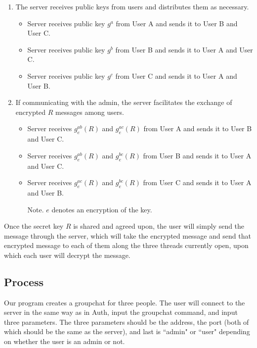 \documentclass[sigconf]{acmart}
\begin{document}
\begin{enumerate}
    \item The server receives public keys from users and distributes them as necessary.
        \begin{itemize}
            \item Server receives public key $g^a$ from User A and sends it to User B and User C.
            \item Server receives public key $g^b$ from User B and sends it to User A and User C.
            \item Server receives public key $g^c$ from User C and sends it to User A and User B.
        \end{itemize}
    \item If communicating with the admin, the server facilitates the exchange of encrypted $R$ messages among users.
        \begin{itemize}
            \item Server receives $g^{ab}_{e}(R)$ and $g^{ac}_{e}(R)$ from User A and sends it to User B and User C.
            \item Server receives $g^{ab}_{e}(R)$ and $g^{bc}_{e}(R)$ from User B and sends it to User A and User C.
            \item Server receives $g^{ac}_{e}(R)$ and $g^{bc}_{e}(R)$ from User C and sends it to User A and User B.
            
            Note. $e$ denotes an encryption of the key.
        \end{itemize}
\end{enumerate}

Once the secret key $R$ is shared and agreed upon, the user will simply send the message through the server, which will take the encrypted message and send that encrypted message to each of them along the three threads currently open, upon which each user will decrypt the message.

\subsection{Process}
Our program creates a groupchat for three people. The user will connect to the server in the same way as in Auth, input the groupchat command, and input three parameters. The three parameters should be the address, the port (both of which should be the same as the server), and last is ``admin" or ``user" depending on whether the user is an admin or not.
\end{document}
